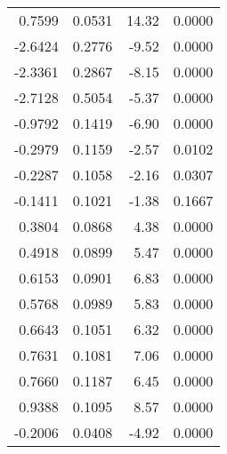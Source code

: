 \begin{table}[ht]
\begin{tabular}{rrrr}
$$  0.7599 & 0.0531 & 14.32 & 0.0000 \\ 
  -2.6424 & 0.2776 & -9.52 & 0.0000 \\ 
  -2.3361 & 0.2867 & -8.15 & 0.0000 \\ 
  -2.7128 & 0.5054 & -5.37 & 0.0000 \\ 
  -0.9792 & 0.1419 & -6.90 & 0.0000 \\ 
  -0.2979 & 0.1159 & -2.57 & 0.0102 \\ 
  -0.2287 & 0.1058 & -2.16 & 0.0307 \\ 
  -0.1411 & 0.1021 & -1.38 & 0.1667 \\ 
  0.3804 & 0.0868 & 4.38 & 0.0000 \\ 
  0.4918 & 0.0899 & 5.47 & 0.0000 \\ 
  0.6153 & 0.0901 & 6.83 & 0.0000 \\ 
  0.5768 & 0.0989 & 5.83 & 0.0000 \\ 
  0.6643 & 0.1051 & 6.32 & 0.0000 \\ 
  0.7631 & 0.1081 & 7.06 & 0.0000 \\ 
  0.7660 & 0.1187 & 6.45 & 0.0000 \\ 
  0.9388 & 0.1095 & 8.57 & 0.0000 \\ 
  -0.2006 & 0.0408 & -4.92 & 0.0000 \\ 
   \hline
\end{tabular}
\end{table}

